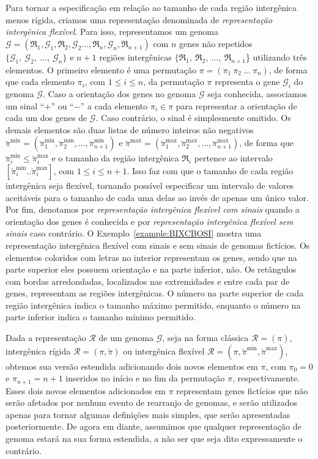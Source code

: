 Para tornar a especificação em relação ao tamanho de cada região intergênica menos rígida, criamos uma representação denominada de \emph{representação intergênica flexível}. Para isso, representamos um genoma $\mathcal{G}=(\mathfrak{R}_1,\mathcal{G}_1,\mathfrak{R}_2,\mathcal{G}_2\dots,\mathfrak{R}_n,\mathcal{G}_n,\mathfrak{R}_{n+1})$ com $n$ genes não repetidos $\{\mathcal{G}_1,\:\mathcal{G}_2,\:\dots,\:\mathcal{G}_n\}$ e $n+1$ regiões intergênicas $\{\mathfrak{R}_1,\:\mathfrak{R}_2,\:\dots,\:\mathfrak{R}_{n+1}$\} utilizando três elementos. O primeiro elemento é uma permutação $\pi=(\pi_1~\pi_2~\dots~\pi_n)$, de forma que cada elemento $\pi_i$, com $1 \le i \le n$, da permutação $\pi$ representa o gene $\mathcal{G}_i$ do genoma $\mathcal{G}$. Caso a orientação dos genes no genoma $\mathcal{G}$ seja conhecida, associamos um sinal ``$+$'' ou ``$-$'' a cada elemento $\pi_i \in \pi$ para representar a orientação de cada um dos genes de $\mathcal{G}$. Caso contrário, o sinal é simplesmente omitido. Os demais elementos são duas listas de número inteiros não negativos $\breve\pi^{\min}=(\breve\pi^{\min}_1,\breve\pi^{\min}_2,\dots,\breve\pi^{\min}_{n+1})$ e $\breve\pi^{\max}=(\breve\pi^{\max}_1,\breve\pi^{\max}_2,\dots,\breve\pi^{\max}_{n+1})$, de forma que $\breve\pi^{\min}_i \le \breve\pi^{\max}_i$ e o tamanho da região intergênica $\mathfrak{R}_i$ pertence ao intervalo $[\breve\pi^{\min}_{i} .. \breve\pi^{\max}_{i}]$, com $1 \le i \le {n+1}$. Isso faz com que o tamanho de cada região intergênica seja flexível, tornando possível especificar um intervalo de valores aceitáveis para o tamanho de cada uma delas ao invés de apenas um único valor. Por fim, denotamos por \emph{representação intergênica flexível com sinais} quando a orientação dos genes é conhecida e por \emph{representação intergênica flexível sem sinais} caso contrário. O Exemplo~\ref{example:BIXCBOSI} mostra uma representação intergênica flexível com sinais e sem sinais de genomas fictícios. Os elementos coloridos com letras no interior representam os genes, sendo que na parte superior eles possuem orientação e na parte inferior, não. Os retângulos com bordas arredondadas, localizados nas extremidades e entre cada par de genes, representam as regiões intergênicas. O número na parte superior de cada região intergênica indica o tamanho máximo permitido, enquanto o número na parte inferior indica o tamanho mínimo permitido.



Dada a representação $\mathcal{R}$ de um genoma $\mathcal{G}$, seja na forma clássica $\mathcal{R}=(\pi)$, intergênica rígida $\mathcal{R}=(\pi,\breve\pi)$ ou intergênica flexível $\mathcal{R}=(\pi,\breve\pi^{\min},\breve\pi^{\max})$, obtemos sua versão estendida adicionando dois novos elementos em $\pi$, com $\pi_0 = 0$ e $\pi_{n+1} = {n+1}$ inseridos no início e no fim da permutação $\pi$, respectivamente. Esses dois novos elementos adicionados em $\pi$ representam genes fictícios que não serão afetados por nenhum evento de rearranjo de genomas, e serão utilizados apenas para tornar algumas definições mais simples, que serão apresentadas posteriormente. De agora em diante, assumimos que qualquer representação de genoma estará na sua forma estendida, a não ser que seja dito expressamente o contrário.

